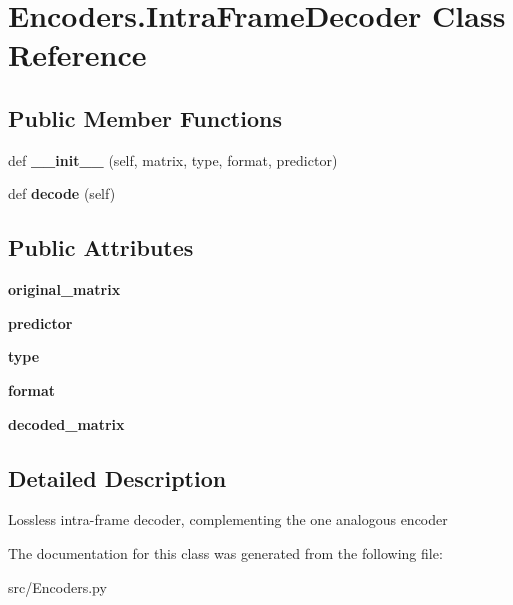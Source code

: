 \hypertarget{classEncoders_1_1IntraFrameDecoder}{}\section{Encoders.\+Intra\+Frame\+Decoder Class Reference}
\label{classEncoders_1_1IntraFrameDecoder}
\subsection*{Public Member Functions}
\begin{DoxyCompactItemize}
\item 
\mbox{\label{classEncoders_1_1IntraFrameDecoder_a19baad3fb71710d58be174fe4ece1de6}} 
def {\bfseries \+\_\+\+\_\+init\+\_\+\+\_\+} (self, matrix, type, format, predictor)
\item 
\mbox{\label{classEncoders_1_1IntraFrameDecoder_a95933d69240c21043d9e98eb43ab8759}} 
def {\bfseries decode} (self)
\end{DoxyCompactItemize}
\subsection*{Public Attributes}
\begin{DoxyCompactItemize}
\item 
\mbox{\label{classEncoders_1_1IntraFrameDecoder_afb2ab2aa69b14cf87f517b811ad1333b}} 
{\bfseries original\+\_\+matrix}
\item 
\mbox{\label{classEncoders_1_1IntraFrameDecoder_a013d57be0df1921b9ae2fb0f311b95c2}} 
{\bfseries predictor}
\item 
\mbox{\label{classEncoders_1_1IntraFrameDecoder_a3daf5986407bd646b443e168afe240d5}} 
{\bfseries type}
\item 
\mbox{\label{classEncoders_1_1IntraFrameDecoder_a25239891ccb5693c7b6898d0963fcaf3}} 
{\bfseries format}
\item 
\mbox{\label{classEncoders_1_1IntraFrameDecoder_ad386b7bcdcb3071f71b4d2d471649383}} 
{\bfseries decoded\+\_\+matrix}
\end{DoxyCompactItemize}


\subsection{Detailed Description}
\begin{DoxyVerb}Lossless intra-frame decoder, complementing the one analogous encoder
\end{DoxyVerb}
 

The documentation for this class was generated from the following file\+:\begin{DoxyCompactItemize}
\item 
src/Encoders.\+py\end{DoxyCompactItemize}
